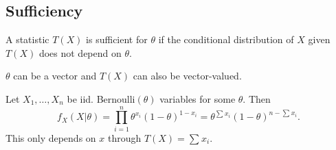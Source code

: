 \documentclass[a4paper]{scrartcl}
\begin{document}
\subsection{Sufficiency}
\begin{definition}[Sufficiency]
     A statistic $T (X)$ is sufficient for $\theta$ if the conditional distribution of $X$ given $T (X)$ does not depend on $\theta$.
\end{definition}
\begin{remark}
      $\theta$ can be a vector and $T (X)$ can also be vector-valued.
\end{remark}
\begin{example}
      Let $X_1 , \ldots ,X_n$ be iid. Bernoulli$(\theta)$  variables for some $\theta$. Then \[
      f_{X}(X|\theta)=\prod_{i=1}^n \theta^{x_{i}}(1-\theta)^{1-x_{i}}=\theta^{\sum_{}^{}x_{i}} (1-\theta)^{n-\sum_{}^{}x_{i}}
      .\] This only depends on $x$ through $T (X)=\sum_{}^{}x_{i}$. 
\end{example}
\end{document}
